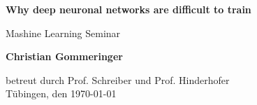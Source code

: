 \documentclass[12pt]{article}
\begin{document}
\begin{titlepage}
    \begin{center}
        \vspace*{1cm}
            
        \Huge
        \textbf{Why deep neuronal networks are difficult to train}
            
        
        \large
        
            
        \vspace{0.7cm}
            Mashine Learning Seminar
        \vspace{2cm}
        

        \textbf{Christian Gommeringer}
            
        \vspace*{7cm}
        
        
            
        
              
        
            
        
            
        \normalsize
        betreut durch Prof. Schreiber und Prof. Hinderhofer\\
        \vspace*{1cm}
        Tübingen, den \today
        
            
    \end{center}
\end{titlepage}
\end{document}
